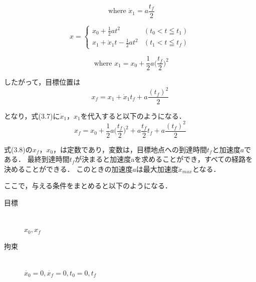 \begin{equation} 
     \text{ where $\dot{x}_1 = a\frac{t_f}{2}$}\nonumber
\end{equation}

\begin{equation} 
     x =
     \begin{cases}
          x_0 + \frac{1}{2}at^2 & ( t_0 < t \leqq t_1 )\\
          x_1 + \dot{x}_1t - \frac{1}{2}at^2 & ( t_1 < t \leqq t_f )
     \end{cases}
\end{equation}

\begin{equation} 
     \text{ where $x_1 = x_0 + \frac{1}{2}a\Big(\frac{t_f}{2}\Big)^2$}\nonumber
\end{equation}

したがって，目標位置は
\begin{equation} 
     x_f = x_1 + \dot{x}_1t_f + a\frac{(t_f)^2}{2}
\end{equation}

となり，式(3.7)に$\dot{x}_1$，$x_1$を代入すると以下のようになる．
\begin{equation} 
     x_f = x_0 + \frac{1}{2}a\Big(\frac{t_f}{2}\Big)^2 + a\frac{t_f}{2}t_f + a\frac{(t_f)^2}{2}
\end{equation}

式(3.8)の$x_f$，$x_0$，は定数であり，変数は，目標地点への到達時間$t_f$と加速度$a$である．
最終到達時間$t_f$が決まると加速度aを求めることができ，すべての経路を決めることができる．
このときの加速度$a$は最大加速度$\ddot{x}_{max}$となる．

ここで，与える条件をまとめると以下のようになる．
\begin{description}
     \item[目標]\mbox{}\\
     $x_0, x_f$
     \item[拘束]\mbox{}\\
     $\dot{x_0}=0, \dot{x_f}=0, t_0=0, t_f$
\end{description}


